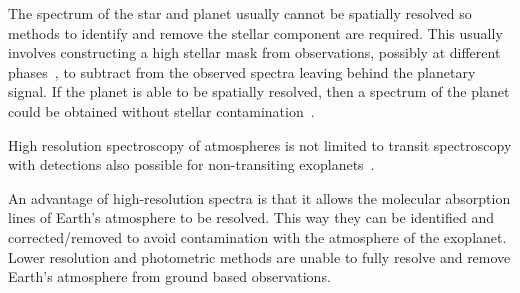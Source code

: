 The spectrum of the star and planet usually cannot be spatially resolved so methods to identify and remove the stellar component are required.
This usually involves constructing a high \snr{} stellar mask from observations, possibly at different phases~\citep[e.g.][]{rodler_weighing_2012}, to subtract from the observed spectra leaving behind the planetary signal.
If the planet is able to be spatially resolved, then a spectrum of the planet could be obtained without stellar contamination~\citep[e.g.][]{snellen_combining_2015}.

High resolution spectroscopy of atmospheres is not limited to transit spectroscopy with detections also possible for non-transiting exoplanets~\citep[e.g.][]{brogi_signature_2012, brogi_carbon_2014,lockwood_nearir_2014, piskorz_evidence_2016}.

An advantage of high-resolution spectra is that it allows the molecular absorption lines of Earth's atmosphere to be resolved.
This way they can be identified and corrected/removed to avoid contamination with the atmosphere of the exoplanet.
Lower resolution and photometric methods are unable to fully resolve and remove Earth's atmosphere from ground based observations.



